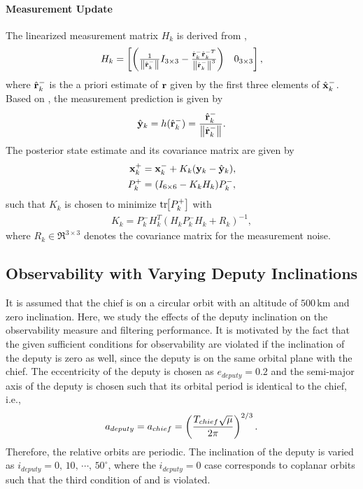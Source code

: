 \paragraph{Measurement Update}
The linearized measurement matrix $H_k$ is derived from ,
\begin{align}
H_k=
\begin{bmatrix}
\left(\frac1{\left\| \hat {\mathbf{r}}_{k}^- \right\|}I_{3\times3}-\frac{\hat {\mathbf{r}}_{k}^-{\hat {\mathbf{r}}_{k}^{-T}}}{\left\| \hat {\mathbf{r}}_{k}^- \right\|^3}\right) & 0_{3\times3}
\end{bmatrix},
\end{align}
where $\hat {\mathbf{r}}_{k}^-$ is the a priori estimate of $\mathbf{r}$ given by the first three elements of $\hat {\mathbf{x}}_{k}^-$.
Based on , the measurement prediction is given by
\begin{align}
\hat{\mathbf{y}}_k=h(\hat {\mathbf{r}}_{k}^-)=\frac{\hat {\mathbf{r}}_{k}^-}{\left\| \hat {\mathbf{r}}_{k}^- \right\|}.
\end{align}
The posterior state estimate and its covariance matrix are given by
\begin{align}
\mathbf{x}^+_k&=\mathbf{x}^-_k+K_k(\mathbf{y}_k-\hat{\mathbf{y}}_k),
\\
P^+_k&=(I_{6\times6}-K_kH_k)P^-_k,
\end{align}
such that $K_k$ is chosen to minimize $\mathrm{tr}\negthickspace\left[ P^+_k \right]$ with
\begin{align}
K_k=P^-_kH_k^T(H_kP^-_kH_k+R_k)^{-1},
\end{align}
where $R_k\in\Re^{3\times 3}$ denotes the covariance matrix for the measurement noise.

\subsection{Observability with Varying Deputy Inclinations}

It is assumed that the chief is on a circular orbit with an altitude of $500\,\mathrm{km}$ and zero inclination. Here, we study the effects of the deputy inclination on the observability measure and filtering performance. It is motivated by the fact that the given sufficient conditions for observability are violated if the inclination of the deputy is zero as well, since the deputy is on the same orbital plane with the chief. The eccentricity of the deputy is chosen as $e_{deputy}=0.2$ and the semi-major axis of the deputy is chosen such that its orbital period is identical to the chief, i.e.,
\begin{align*}
a_{deputy} = a_{chief} = \left( \frac{T_{chief}\sqrt{\mu}}{2\pi} \right)^{2/3}.
\end{align*}
Therefore, the relative orbits are periodic. The inclination of the deputy is varied as $i_{deputy}=0,\,10,\,\cdots,\,50^\circ$, where the $i_{deputy}=0$ case corresponds to coplanar orbits such that the third condition of  and  is violated.

